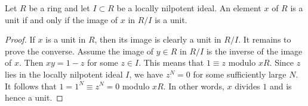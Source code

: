 \begin{lemma}
\label{lemma-locally-nilpotent-unit}
Let $R$ be a ring and let $I \subset R$ be a locally nilpotent
ideal.
An element $x$ of $R$ is a unit if and only if the image of $x$
in $R/I$ is a unit.
\end{lemma}

\begin{proof}
If $x$ is a unit in $R$, then its image is clearly a unit in $R/I$.
It remains to prove the converse.
Assume the image of $y \in R$ in $R/I$ is the inverse of the image of $x$.
Then $xy = 1 - z$ for some $z \in I$.
This means that $1\equiv z$ modulo $xR$.
Since $z$ lies in the locally nilpotent ideal
$I$, we have $z^N = 0$ for some sufficiently large $N$.
It follows that $1 = 1^N \equiv z^N = 0$ modulo $xR$.
In other words, $x$ divides $1$ and is hence a unit.
\end{proof}